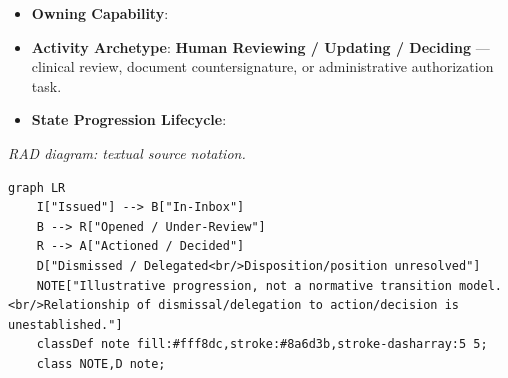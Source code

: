\begin{itemize}

\item
\textbf{Owning Capability}: \texttt{}



\item
\textbf{Activity Archetype}: \textbf{Human Reviewing /\allowbreak{} Updating /\allowbreak{} Deciding} — clinical review, document countersignature, or administrative authorization task.



\item
\textbf{State Progression Lifecycle}:



\end{itemize}
\label{rad:processes:302}

\textit{RAD diagram: textual source notation.}
\begin{Verbatim}[breaklines,fontsize=\footnotesize]
graph LR
    I["Issued"] --> B["In-Inbox"]
    B --> R["Opened / Under-Review"]
    R --> A["Actioned / Decided"]
    D["Dismissed / Delegated<br/>Disposition/position unresolved"]
    NOTE["Illustrative progression, not a normative transition model.<br/>Relationship of dismissal/delegation to action/decision is unestablished."]
    classDef note fill:#fff8dc,stroke:#8a6d3b,stroke-dasharray:5 5;
    class NOTE,D note;
\end{Verbatim}
\label{rad:processes:312}

